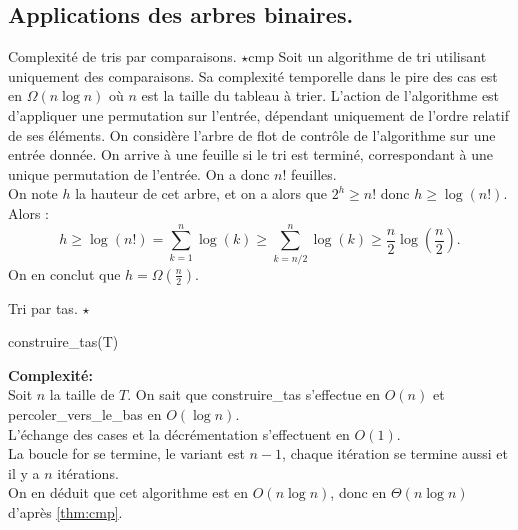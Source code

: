 \documentclass[french, 11pt]{article}
\begin{document}
\pagebreak 

\subsection{Applications des arbres binaires.}

\begin{thm}{Complexité de tris par comparaisons. $\star$}{cmp}
    Soit un algorithme de tri utilisant uniquement des comparaisons. Sa complexité temporelle dans le pire des cas est en $\Omega(n\log n)$ où $n$ est la taille du tableau à trier.
    \tcblower
    L'action de l'algorithme est d'appliquer une permutation sur l'entrée, dépendant uniquement de l'ordre relatif de ses éléments.
    On considère l'arbre de flot de contrôle de l'algorithme sur une entrée donnée. On arrive à une feuille si le tri est terminé, correspondant à une unique permutation de l'entrée. On a donc $n!$ feuilles.\\
    On note $h$ la hauteur de cet arbre, et on a alors que $2^h \geq n!$ donc $h\geq\log(n!)$. Alors :
    \begin{equation*}
        h\geq\log(n!)=\sum_{k=1}^n\log(k)\geq\sum_{k=n/2}^n\log(k)\geq\frac{n}{2}\log\left(\frac{n}{2}\right).
    \end{equation*}
    On en conclut que $h=\Omega(\frac{n}{2})$.
\end{thm}

\begin{defi}{Tri par tas. $\star$}{}
    \begin{algorithm}[H]
        \caption{Tri par tas}
        construire\_tas(T)\\
    \end{algorithm}
    \textbf{Complexité:}\\
    Soit $n$ la taille de $T$. On sait que construire\_tas s'effectue en $O(n)$ et percoler\_vers\_le\_bas en $O(\log n)$.\\
    L'échange des cases et la décrémentation s'effectuent en $O(1)$.\\
    La boucle for se termine, le variant est $n-1$, chaque itération se termine aussi et il y a $n$ itérations.\\
    On en déduit que cet algorithme est en $O(n\log n)$, donc en $\Theta(n\log n)$ d'après \ref{thm:cmp}.
\end{defi}
\end{document}
